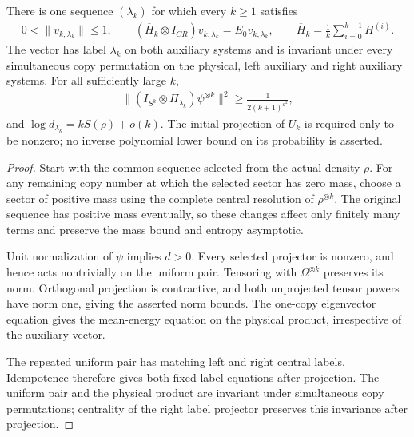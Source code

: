 \begin{theorem}
    \label{thm:replica_prevector_sequence}
    \leanok
    There is one sequence $(\lambda_k)$ for which every $k\ge1$ satisfies
    \begin{align}
        0<\|v_{k,\lambda_k}\|\le1,
        \qquad (\overline H_k\otimes I_{CR})v_{k,\lambda_k}
        =E_0v_{k,\lambda_k},
        \qquad \overline H_k=\frac1k\sum_{i=0}^{k-1}H^{(i)}.
    \end{align}
    The vector has label $\lambda_k$ on both auxiliary systems and is invariant
    under every simultaneous copy permutation on the physical, left auxiliary
    and right auxiliary systems. For all sufficiently large $k$,
    \begin{align}
        \|(I_{S^k}\otimes\Pi_{\lambda_k})\psi^{\otimes k}\|^2
        \ge\frac1{2(k+1)^{d^2}},
    \end{align}
    and $\log d_{\lambda_k}=kS(\rho)+o(k)$.
    The initial projection of $U_k$ is required only to be nonzero; no inverse
    polynomial lower bound on its probability is asserted.
\end{theorem}
\begin{proof}
    \leanok
    Start with the common sequence selected from the actual density $\rho$.
    For any remaining copy number at which the selected sector has zero mass,
    choose a sector of positive mass using the complete central resolution of
    $\rho^{\otimes k}$. The original sequence has positive mass eventually,
    so these changes affect only finitely many terms and preserve the mass
    bound and entropy asymptotic.

    Unit normalization of $\psi$ implies $d>0$. Every selected projector is
    nonzero, and hence acts nontrivially on the uniform pair. Tensoring with
    $\Omega^{\otimes k}$ preserves its norm. Orthogonal projection is contractive,
    and both unprojected tensor powers have norm one, giving the asserted norm
    bounds. The one-copy eigenvector equation gives the mean-energy equation
    on the physical product, irrespective of the auxiliary vector.

    The repeated uniform pair has matching left and right central labels.
    Idempotence therefore gives both fixed-label equations after projection.
    The uniform pair and the physical product are invariant under simultaneous
    copy permutations; centrality of the right label projector preserves this
    invariance after projection.
\end{proof}
